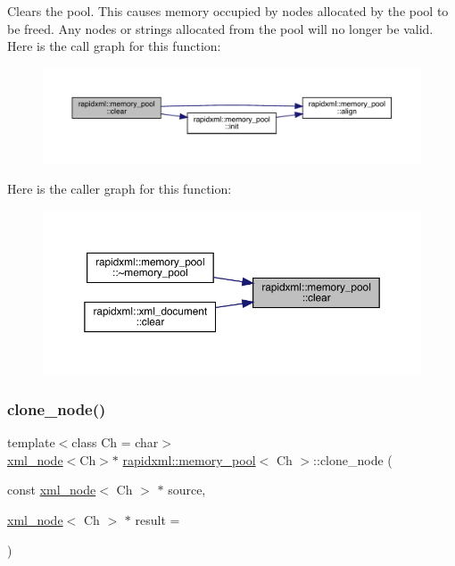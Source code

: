 Clears the pool. This causes memory occupied by nodes allocated by the pool to be freed. Any nodes or strings allocated from the pool will no longer be valid. Here is the call graph for this function\+:\nopagebreak
\begin{figure}[H]
\begin{center}
\leavevmode
\includegraphics[width=350pt]{classrapidxml_1_1memory__pool_aad377c835fdaed1cb2cc9df194cf84e4_cgraph}
\end{center}
\end{figure}
Here is the caller graph for this function\+:\nopagebreak
\begin{figure}[H]
\begin{center}
\leavevmode
\includegraphics[width=350pt]{classrapidxml_1_1memory__pool_aad377c835fdaed1cb2cc9df194cf84e4_icgraph}
\end{center}
\end{figure}
\mbox{\label{classrapidxml_1_1memory__pool_a0a10679fc17597d339a0dc107f8a94ac}} 
\subsubsection{\texorpdfstring{clone\_node()}{clone\_node()}}
{\footnotesize\ttfamily template$<$class Ch  = char$>$ \\
\mbox{\hyperlink{classrapidxml_1_1xml__node}{xml\+\_\+node}}$<$Ch$>$$\ast$ \mbox{\hyperlink{classrapidxml_1_1memory__pool}{rapidxml\+::memory\+\_\+pool}}$<$ Ch $>$\+::clone\+\_\+node (\begin{DoxyParamCaption}\item[{const \mbox{\hyperlink{classrapidxml_1_1xml__node}{xml\+\_\+node}}$<$ Ch $>$ $\ast$}]{source,  }\item[{\mbox{\hyperlink{classrapidxml_1_1xml__node}{xml\+\_\+node}}$<$ Ch $>$ $\ast$}]{result = {} }\end{DoxyParamCaption})\hspace{0.3cm}{\ttfamily [inline]}}

